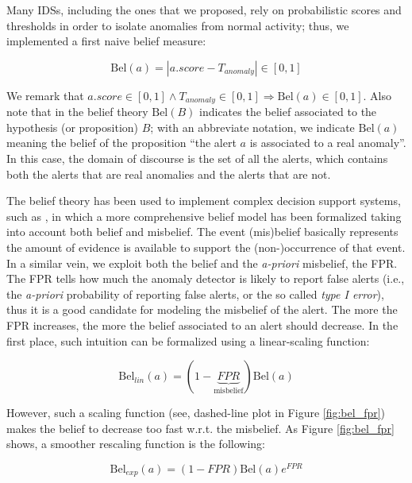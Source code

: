 Many \acp{IDS}, including the ones that we proposed, rely on probabilistic scores and thresholds in order to isolate anomalies from normal activity; thus, we implemented a first naive belief measure:

\begin{equation}\label{eq:bel}
  \mathrm{Bel}(a) = |a.score - T_{anomaly}| \in [0, 1]
\end{equation}

We remark that $a.score \in [0,1] \wedge T_{anomaly} \in [0,1] \Rightarrow \mathrm{Bel}(a) \in [0, 1]$. Also note that in the belief theory \citep{fuzzymeasure,folger_klir} $\mathrm{Bel}(B)$ indicates the belief associated to the hypothesis (or proposition) $B$; with an abbreviate notation, we indicate $\mathrm{Bel}(a)$ meaning the belief of the proposition ``the alert $a$ is associated to a real anomaly''. In this case, the domain of discourse is the set of all the alerts, which contains both the alerts that are real anomalies and the alerts that are not.

The belief theory has been used to implement complex decision support systems, such as \citep{mycin}, in which a more comprehensive belief model has been formalized taking into account both belief and misbelief. The event (mis)belief basically represents the amount of evidence is available to support the (non-)occurrence of that event. In a similar vein, we exploit both the belief and the \emph{a-priori} misbelief, the \ac{FPR}. The \ac{FPR} tells how much the anomaly detector is likely to report false alerts (i.e., the \emph{a-priori} probability of reporting false alerts, or the so called \emph{type I error}), thus it is a good candidate for modeling the misbelief of the alert. The more the \ac{FPR} increases, the more the belief associated to an alert should decrease. In the first place, such intuition can be formalized using a linear-scaling function:

\begin{equation}\label{eq:bel_lin}
  \mathrm{Bel}_{lin}(a) = (1-\underbrace{FPR}_{\mathrm{misbelief}})\mathrm{Bel}(a)
\end{equation}

However, such a scaling function (see, dashed-line plot in Figure \ref{fig:bel_fpr}) makes the belief to decrease too fast w.r.t. the misbelief. As Figure \ref{fig:bel_fpr} shows, a smoother rescaling function is the following:

\begin{equation}\label{eq:bel_exp}
  \mathrm{Bel}_{exp}(a) = (1-FPR) \mathrm{Bel}(a) e^{FPR}
\end{equation}

